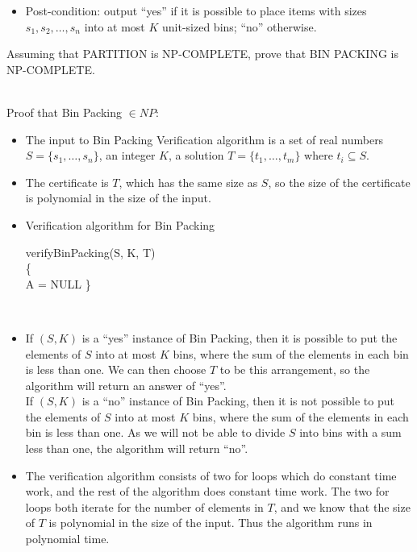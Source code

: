 \documentclass{assignment}
\begin{document}
\begin{problemlist}
\begin{problem}
\begin{itemize}
\item Post-condition: output ``yes'' if it is possible to place items with sizes $s_1,s_2,\ldots,s_n$ into at most $K$ unit-sized bins; ``no'' otherwise.
\end{itemize}
Assuming that PARTITION is NP-COMPLETE, prove that BIN PACKING is NP-COMPLETE.
\end{problem}
\begin{answer}
\\
Proof that Bin Packing $\in NP$:
\begin{itemize}
\item The input to Bin Packing Verification algorithm is a set of real numbers $S=\{s_1,\ldots,s_n\}$, an integer $K$, a solution $T=\{t_1,\ldots,t_m\}$ where $t_i\subseteq S$.
\item The certificate is $T$, which has the same size as $S$, so the size of the certificate is polynomial in the size of the input.
\item Verification algorithm for Bin Packing
\IncMargin{3em}
\begin{algorithm}
  verifyBinPacking(S, K, T)\\\{\\
  \Indp
  A = NULL\;
  \;
  \Indm
  \}
\end{algorithm}
\DecMargin{3em}\\
\item If $(S, K)$ is a ``yes'' instance of Bin Packing, then it is possible to put the elements of $S$ into at most $K$ bins, where the sum of the elements in each bin is less than one. We can then choose $T$ to be this arrangement, so the algorithm will return an answer of ``yes''.\\
If $(S, K)$ is a ``no'' instance of Bin Packing, then it is not possible to put the elements of $S$ into at most $K$ bins, where the sum of the elements in each bin is less than one. As we will not be able to divide $S$ into bins with a sum less than one, the algorithm will return ``no''.
\item The verification algorithm consists of two for loops which do constant time work, and the rest of the algorithm does constant time work. The two for loops both iterate for the number of elements in $T$, and we know that the size of $T$ is polynomial in the size of the input. Thus the algorithm runs in polynomial time.

\end{itemize}
\end{answer}
\end{problemlist}
\end{document}
